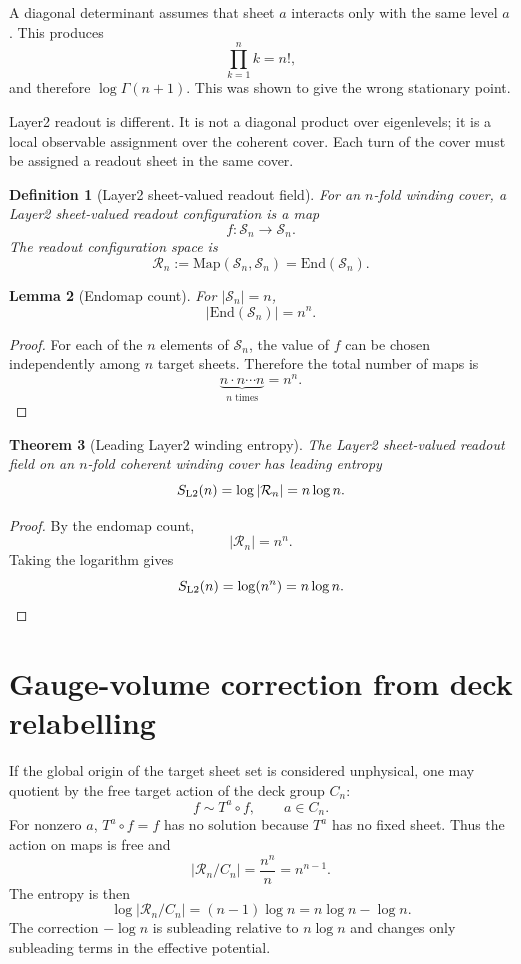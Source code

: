 \documentclass[12pt,a4paper]{article}
\newtheorem{definition}{Definition}[section]
\newtheorem{lemma}[definition]{Lemma}
\newtheorem{theorem}[definition]{Theorem}
\begin{document}
A diagonal determinant assumes that sheet $a$ interacts only with the same
level $a$.  This produces
\[
  \prod_{k=1}^{n}k=n!,
\]
and therefore $\log\Gamma(n+1)$.  This was shown to give the wrong stationary
point.

Layer2 readout is different.  It is not a diagonal product over eigenlevels; it
is a local observable assignment over the coherent cover.  Each turn of the
cover must be assigned a readout sheet in the same cover.

\begin{definition}[Layer2 sheet-valued readout field]
For an $n$-fold winding cover, a Layer2 sheet-valued readout configuration is a
map
\[
  f:\mathcal S_n\longrightarrow\mathcal S_n.
\]
The readout configuration space is
\[
  \mathcal R_n:=\mathrm{Map}(\mathcal S_n,\mathcal S_n)
  =\mathrm{End}(\mathcal S_n).
\]
\end{definition}

\begin{lemma}[Endomap count]
For $|\mathcal S_n|=n$,
\[
  |\mathrm{End}(\mathcal S_n)|=n^n.
\]
\end{lemma}

\begin{proof}
For each of the $n$ elements of $\mathcal S_n$, the value of $f$ can be chosen
independently among $n$ target sheets.  Therefore the total number of maps is
\[
  \underbrace{n\cdot n\cdots n}_{n\text{ times}}=n^n.
\]
\end{proof}

\begin{theorem}[Leading Layer2 winding entropy]
The Layer2 sheet-valued readout field on an $n$-fold coherent winding cover has
leading entropy
\[
  S_{\rm L2}(n)=\log|\mathcal R_n|=n\log n.
\]
\end{theorem}

\begin{proof}
By the endomap count,
\[
  |\mathcal R_n|=n^n.
\]
Taking the logarithm gives
\[
  S_{\rm L2}(n)=\log(n^n)=n\log n.
\]
\end{proof}

\section{Gauge-volume correction from deck relabelling}

If the global origin of the target sheet set is considered unphysical, one may
quotient by the free target action of the deck group $C_n$:
\[
  f\sim T^a\circ f,
  \qquad a\in C_n.
\]
For nonzero $a$, $T^a\circ f=f$ has no solution because $T^a$ has no fixed sheet.
Thus the action on maps is free and
\[
  |\mathcal R_n/C_n|=\frac{n^n}{n}=n^{n-1}.
\]
The entropy is then
\[
  \log|\mathcal R_n/C_n|=(n-1)\log n=n\log n-\log n.
\]
The correction $-\log n$ is subleading relative to $n\log n$ and changes only
subleading terms in the effective potential.
\end{document}
